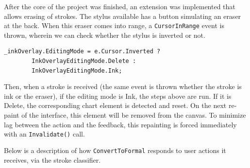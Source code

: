 	After the core of the project was finished, an extension was implemented that allows erasing of strokes. The stylus available has a button simulating an eraser at the back. When this eraser comes into range, a \texttt{CursorInRange} event is thrown, wherein we can check whether the stylus is inverted or not.
	
	\begin{lstlisting}[frame=single]
_inkOverlay.EditingMode = e.Cursor.Inverted ? 
		InkOverlayEditingMode.Delete : 
		InkOverlayEditingMode.Ink;
	\end{lstlisting}
	
	Then, when a stroke is received (the same event is thrown whether the stroke is ink or the eraser), if the editing mode is Ink, the steps above are run. If it is Delete, the corresponding chart element is detected and reset. On the next re-paint of the interface, this element will be removed from the canvas. To minimize lag between the action and the feedback, this repainting is forced immediately with an \texttt{Invalidate()} call.
	
	 Below is a description of how \texttt{ConvertToFormal} responds to user actions it receives, via the stroke classifier. 
	
